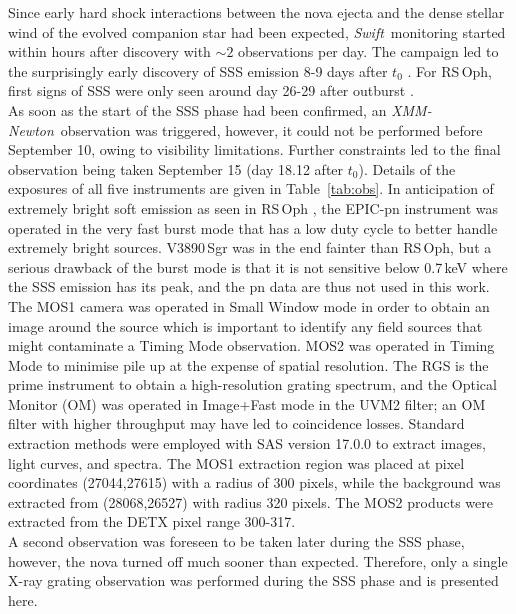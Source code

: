\documentclass{aa}
\newcommand{\swift}{{\it Swift}}
\newcommand{\xmm}{{\it XMM-Newton}}
\begin{document}
Since early hard shock interactions between the nova ejecta and the
dense stellar wind of the evolved companion star had been expected,
\swift\ monitoring started within hours after discovery with
$\sim 2$ observations per day. The campaign led to the surprisingly
early discovery of SSS emission 8-9 days after $t_0$ \citep{sw_sss}.
For RS\,Oph, first signs of SSS were only seen around day 26-29 after
outburst \citep{osborne11}.\\
As soon as the start of the SSS phase had been confirmed, an \xmm\
observation was triggered, however, it could not be performed before
September 10, owing to visibility
limitations. Further constraints led to the final observation being
taken September 15 (day 18.12 after $t_0$). Details of the exposures of
all five instruments are given in Table~\ref{tab:obs}. In anticipation
of extremely bright soft emission as seen in RS\,Oph \citep{nessrsoph},
the EPIC-pn instrument was operated in the very fast burst mode that
has a low duty cycle to better handle extremely bright sources. V3890\,Sgr
was in the end fainter than RS\,Oph, but a serious drawback of the burst
mode is that it is not sensitive below 0.7\,keV where the SSS emission
has its peak, and the pn data are thus not used in this work. The MOS1
camera was operated in Small Window mode in order to obtain an image
around the source which is important to identify any field sources that
might contaminate a Timing Mode observation. MOS2 was
operated in Timing Mode to minimise pile up at the expense of spatial
resolution. The RGS is the prime instrument to obtain a
high-resolution grating spectrum, and the Optical Monitor (OM) was operated
in Image+Fast mode in the UVM2 filter; an OM filter with higher throughput
may have led to coincidence losses. Standard extraction methods were
employed with SAS version 17.0.0 to extract images, light curves, and
spectra. The MOS1 extraction region was placed at pixel coordinates
(27044,27615) with a radius of 300 pixels, while the background was
extracted from (28068,26527) with radius 320 pixels. The MOS2 products
were extracted from the DETX pixel range 300-317.\\

A second observation was foreseen to be taken later during the SSS phase,
however, the nova turned off much sooner than expected. Therefore, only a single
X-ray grating observation was performed during the SSS phase and is presented
here.\\
\end{document}
